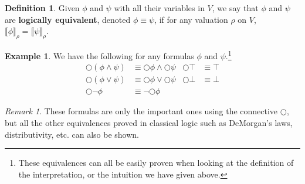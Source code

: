 \documentclass{tufte-handout} %
\theoremstyle{definition}
\newtheorem{defn}[thm]{Definition}
\newtheorem{exmp}[thm]{Example}
\theoremstyle{remark}
\newtheorem{rem}[thm]{Remark}
\newcommand{\0}{\textsf{0}}
\newcommand{\1}{\textsf{1}}
\newcommand{\sem}[2]{\llbracket #1 \rrbracket_{#2}}
\begin{document}
\begin{defn}
	Given $\phi$ and $\psi$ with all their variables in $V$, we say that $\phi$ and $\psi$ are \textbf{logically equivalent}, denoted $\phi \equiv \psi$, if for any valuation $\rho$ on $V$, $\sem{\phi}{\rho} = \sem{\psi}{\rho}$.
\end{defn}
\begin{exmp}
	We have the following for any formulas $\phi$ and $\psi$.\footnote{These equivalences can all be easily proven when looking at the definition of the interpretation, or the intuition we have given above.}
	\begin{align*}
		\bigcirc (\phi \wedge \psi) &\equiv \bigcirc\phi \wedge \bigcirc\psi & \bigcirc \top &\equiv \top\\
		\bigcirc (\phi \vee \psi) &\equiv \bigcirc \phi \vee \bigcirc\psi & \bigcirc \bot &\equiv \bot\\
		\bigcirc \neg \phi &\equiv \neg\bigcirc\phi
	\end{align*}
\end{exmp}
\begin{rem}
	These formulas are only the important ones using the connective $\bigcirc$, but all the other equivalences proved in classical logic such as DeMorgan's laws, distributivity, etc. can also be shown.
	
\end{rem}
\end{document}

